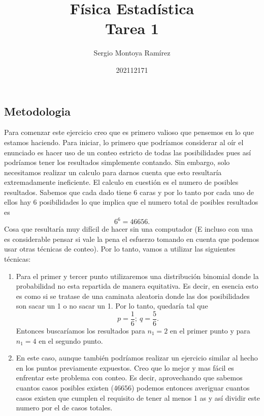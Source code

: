 \documentclass{report}
\title{\Huge{Física Estadística}\\Tarea 1}
\author{\huge{Sergio Montoya Ramírez}}
\date{202112171}
\begin{document}
\maketitle
\newpage%
\tableofcontents
\pagebreak

\chapter{}

\section*{Metodologia}

Para comenzar este ejercicio creo que es primero valioso que pensemos en lo que estamos haciendo. Para iniciar, lo primero que podríamos considerar al oír el enunciado es hacer uso de un conteo estricto de todas las posibilidades pues así podríamos tener los resultados simplemente contando. Sin embargo, solo necesitamos realizar un calculo para darnos cuenta que esto resultaría extremadamente ineficiente. El calculo en cuestión es el numero de posibles resultados. Sabemos que cada dado tiene 6 caras y por lo tanto por cada uno de ellos hay 6 posibilidades lo que implica que el numero total de posibles resultados es \[
6^{6} = 46656
.\] Cosa que resultaría muy difícil de hacer sin una computador (E incluso con una es considerable pensar si vale la pena el esfuerzo tomando en cuenta que podemos usar otras técnicas de conteo). Por lo tanto, vamos a utilizar las siguientes técnicas:

\begin{enumerate}
  \item Para el primer y tercer punto utilizaremos una distribución binomial donde la probabilidad no esta repartida de manera equitativa. Es decir, en esencia esto es como si se tratase de una caminata aleatoria donde las dos posibilidades son sacar un 1 o no sacar un 1. Por lo tanto, quedaría tal que \[
  p = \frac{1}{6};\ q = \frac{5}{6}
  .\] Entonces buscaríamos los resultados para $n_1 = 2$ en el primer punto y para $n_1 = 4$ en el segundo punto.
\item En este caso, aunque también podríamos realizar un ejercicio similar al hecho en los puntos previamente expuestos. Creo que lo mejor y mas fácil es enfrentar este problema con conteo. Es decir, aprovechando que sabemos cuantos casos posibles existen ($46656$) podemos entonces averiguar cuantos casos existen que cumplen el requisito de tener al menos 1 as y así dividir este numero por el de casos totales.
\end{enumerate}
\end{document}
